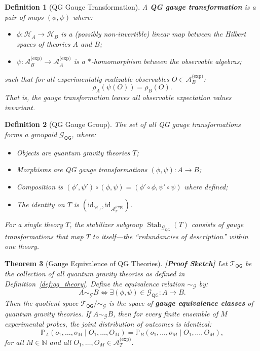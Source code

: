 \documentclass[12pt,a4paper]{article}
\newtheorem{theorem}{Theorem}[section]
\newtheorem{definition}[theorem]{Definition}
\theoremstyle{remark}
\newcommand{\N}{\mathbb{N}}
\newcommand{\Pbb}{\mathbb{P}}
\newcommand{\G}{\mathcal{G}}
\newcommand{\T}{\mathcal{T}}
\newcommand{\A}{\mathcal{A}}
\newcommand{\Hilb}{\mathcal{H}}
\newcommand{\QG}{\textsf{QG}}
\DeclareMathOperator{\Stab}{Stab}
\newcommand{\rigorSketch}{\textbf{[Proof Sketch]}}
\begin{document}
\begin{definition}[QG Gauge Transformation]
\label{def:qg_gauge}
A \textbf{QG gauge transformation} is a pair of maps $(\phi, \psi)$ where:
\begin{itemize}[leftmargin=*]
  \item $\phi: \Hilb_A \to \Hilb_B$ is a (possibly non-invertible) linear map between the Hilbert spaces of theories $A$ and $B$;
  \item $\psi: \A_B^{\text{(exp)}} \to \A_A^{\text{(exp)}}$ is a $*$-homomorphism between the observable algebras;
\end{itemize}
such that for all experimentally realizable observables $O \in \A_B^{\text{(exp)}}$:
\begin{equation}
  \label{eq:gauge_inv}
  \rho_A(\psi(O)) = \rho_B(O).
\end{equation}
That is, the gauge transformation leaves all observable expectation values invariant.
\end{definition}

\begin{definition}[QG Gauge Group]
\label{def:gauge_group}
The set of all QG gauge transformations forms a groupoid $\G_{\QG}$, where:
\begin{itemize}[leftmargin=*]
  \item Objects are quantum gravity theories $T$;
  \item Morphisms are QG gauge transformations $(\phi, \psi): A \to B$;
  \item Composition is $( \phi', \psi' ) \circ ( \phi, \psi ) = ( \phi' \circ \phi, \psi' \circ \psi )$ where defined;
  \item The identity on $T$ is $(\text{id}_{\Hilb_T}, \text{id}_{\A_T^{\text{(exp)}}})$.
\end{itemize}
For a single theory $T$, the stabilizer subgroup $\Stab_{\G_{\QG}}(T)$ consists of gauge transformations that map $T$ to itself---the ``redundancies of description'' within one theory.
\end{definition}

\begin{theorem}[Gauge Equivalence of QG Theories]
\label{thm:gauge_equivalence}
\rigorSketch
Let $\T_{\QG}$ be the collection of all quantum gravity theories as defined in Definition~\ref{def:qg_theory}. Define the equivalence relation $\sim_{\G}$ by:
\begin{equation}
  A \sim_{\G} B \iff \exists (\phi, \psi) \in \G_{\QG} : A \to B.
\end{equation}
Then the quotient space $\T_{\QG} / \sim_{\G}$ is the space of \textbf{gauge equivalence classes} of quantum gravity theories. If $A \sim_{\G} B$, then for every finite ensemble of $M$ experimental probes, the joint distribution of outcomes is identical:
\begin{equation}
  \label{eq:finite_inv}
  \Pbb_A(o_1, \ldots, o_M \mid O_1, \ldots, O_M) =
  \Pbb_B(o_1, \ldots, o_M \mid O_1, \ldots, O_M),
\end{equation}
for all $M \in \N$ and all $O_1, \ldots, O_M \in \A_T^{\text{(exp)}}$.
\end{theorem}
\end{document}
